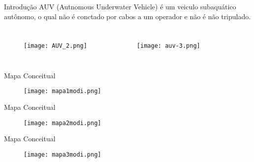 \begin{frame}[t]{Introdução} 
    \transdissolve[duration=0.5]
    AUV (Autnomous Underwater Vehicle) é um veiculo subaquático autônomo, o qual não é conctado por cabos 
    a um operador e não é não tripulado.

    \begin{columns}[t]
        
        \begin{figure}
            \texttt{[image: AUV\_2.png]}%
            \caption{\nocite{REMUS6001:online}}
        \end{figure}
        
        \begin{figure}
           \texttt{[image: auv-3.png]}%
            \caption{\nocite{BlueROV210:online}}
        \end{figure}
        
    \end{columns}

\end{frame}
\begin{frame}[c]{Mapa Conceitual}
        \begin{figure}
        \texttt{[image: mapa1modi.png]}
    \end{figure}
\end{frame}
\begin{frame}[c]{Mapa Conceitual}
        \begin{figure}
        \texttt{[image: mapa2modi.png]}
    \end{figure}
\end{frame}
\begin{frame}[c]{Mapa Conceitual}
        \begin{figure}
        \texttt{[image: mapa3modi.png]}
    \end{figure}
\end{frame}

